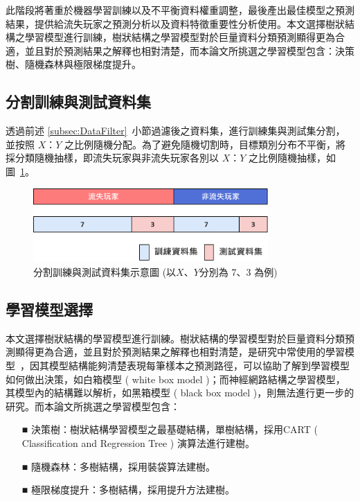 此階段將著重於機器學習訓練以及不平衡資料權重調整，最後產出最佳模型之預測結果，提供給流失玩家之預測分析以及資料特徵重要性分析使用。本文選擇樹狀結構之學習模型進行訓練，樹狀結構之學習模型對於巨量資料分類預測顯得更為合適，並且對於預測結果之解釋也相對清楚，而本論文所挑選之學習模型包含：決策樹、隨機森林與極限梯度提升。

\subsection{分割訓練與測試資料集}
\label{subsec:SplitDataset}

透過前述 \ref{subsec:DataFilter}~小節過濾後之資料集，進行訓練集與測試集分割，並按照 $X$：$Y$ 之比例隨機分配。為了避免隨機切割時，目標類別分布不平衡，將採分類隨機抽樣，即流失玩家與非流失玩家各別以 $X$：$Y$ 之比例隨機抽樣，如圖~\ref{fig:Image_SplitDataset}。

\begin{figure}[!htb]
  \begin{center}
    \includegraphics[width=0.8\textwidth]{figures/Image_SplitDataset.png}
    \caption[分割訓練與測試資料集示意圖]{分割訓練與測試資料集示意圖 (以$X$、$Y$分別為 7、3 為例) }
    \label{fig:Image_SplitDataset}
  \end{center}
\end{figure}

\subsection{學習模型選擇}
\label{subsec:ModelSelection}

本文選擇樹狀結構的學習模型進行訓練。樹狀結構的學習模型對於巨量資料分類預測顯得更為合適，並且對於預測結果之解釋也相對清楚，是研究中常使用的學習模型~\cite{wu2008top}，因其模型結構能夠清楚表現每筆樣本之預測路徑，可以協助了解到學習模型如何做出決策，如白箱模型 ( white box model )；而神經網路結構之學習模型，其模型內的結構難以解析，如黑箱模型 ( black box model )，則無法進行更一步的研究。而本論文所挑選之學習模型包含：

\begin{itemize}
  \item [■] 決策樹：樹狀結構學習模型之最基礎結構，單樹結構，採用CART ( Classification and Regression Tree ) 演算法進行建樹。
  \item [■] 隨機森林：多樹結構，採用裝袋算法建樹。
  \item [■] 極限梯度提升：多樹結構，採用提升方法建樹。
\end{itemize}

